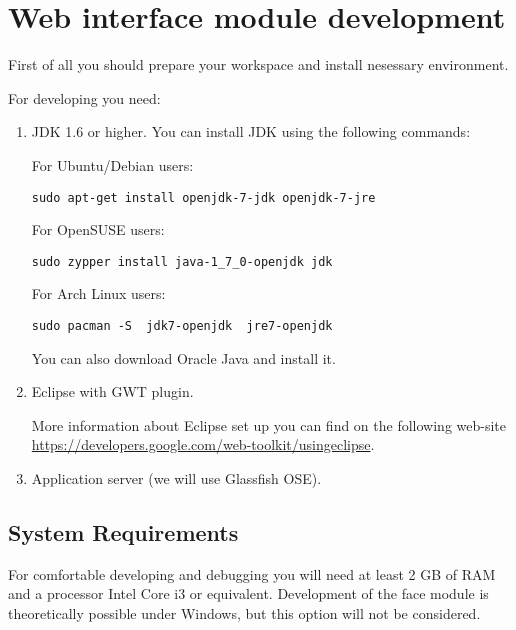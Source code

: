 \section{Web interface module development}

First of all you should prepare your workspace and install nesessary environment.

For developing you need:

\begin{enumerate}

\item JDK 1.6 or higher.
You can install JDK using the following commands:

For Ubuntu/Debian users:

\begin{lstlisting}
sudo apt-get install openjdk-7-jdk openjdk-7-jre
\end{lstlisting}

For OpenSUSE users:

\begin{lstlisting}
sudo zypper install java-1_7_0-openjdk jdk
\end{lstlisting}

For Arch Linux users:

\begin{lstlisting}
sudo pacman -S  jdk7-openjdk  jre7-openjdk
\end{lstlisting}

You can also download Oracle Java and install it.

\item Eclipse with GWT plugin.

More information about Eclipse set up you can find on the following web-site \url{https://developers.google.com/web-toolkit/usingeclipse}.

\item Application server (we will use Glassfish OSE).

\end{enumerate}

\subsection{System Requirements}

For comfortable developing and debugging you will need at least 2 GB of RAM and a processor Intel Core i3 or equivalent. Development of the face module is theoretically possible under Windows, but this option will not be considered.

